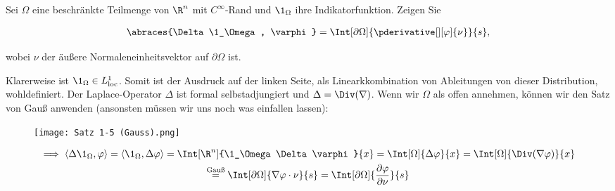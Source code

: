 
\begin{exercise}

Sei $\Omega$ eine beschränkte Teilmenge von $\R^n$ mit $C^{\infty}$-Rand und $\1_\Omega$ ihre Indikatorfunktion.
Zeigen Sie

\begin{align*}
  \abraces{\Delta \1_\Omega, \varphi}
  =
  \Int[\partial \Omega]{\pderivative[][\varphi]{\nu}}{s},
\end{align*}

wobei $\nu$ der äußere Normaleneinheitsvektor auf $\partial \Omega$ ist.

\end{exercise}


\begin{solution}

Klarerweise ist $\1_\Omega \in L^1_{\mathrm{loc}}$.
Somit ist der Ausdruck auf der linken Seite, als Linearkkombination von Ableitungen von dieser Distribution, wohldefiniert.
Der Laplace-Operator $\Delta$ ist formal selbstadjungiert und $\Delta = \Div(\nabla)$.
Wenn wir $\Omega$ als offen annehmen, können wir den Satz von Gauß anwenden
(ansonsten müssen wir uns noch was einfallen lassen):
\begin{figure}[h!]
  \centering
  \texttt{[image: Satz 1-5 (Gauss).png]}
\end{figure}

\begin{multline*}
  \implies
  \langle \Delta \1_\Omega, \varphi \rangle
  =
  \langle  \1_\Omega, \Delta \varphi \rangle
  =
  \Int[\R^n]{\1_\Omega \Delta \varphi}{x}
  =
  \Int[\Omega]{\Delta \varphi}{x}
  =
  \Int[\Omega]{\Div(\nabla \varphi)}{x} \\
  \stackrel{\text{Gauß}}{=}
  \Int[\partial \Omega]{\nabla \varphi \cdot \nu}{s}
  =
  \Int[\partial \Omega]{\frac{\partial \varphi}{\partial \nu}}{s}
\end{multline*}

\end{solution}

